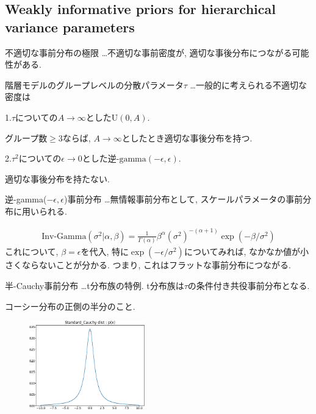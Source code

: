 \documentclass[11pt,a4pape,dvipdfmx]{jarticle}
\newcommand{\eqn}[1]{\begin{align*}#1\end{align*}}
\begin{document}

\subsection{Weakly informative priors for hierarchical variance parameters}
\begin{itembox}[l]{不適切な事前分布の極限}
…不適切な事前密度が, 適切な事後分布につながる可能性がある.
\end{itembox}


\begin{itembox}[l]{階層モデルのグループレベルの分散パラメータ$\tau$}
…一般的に考えられる不適切な密度は

1.$\tau$についての$A\rightarrow \infty$とした$\text{U}(0, A)$.

グループ数$\geq 3$ならば, $A\rightarrow\infty$としたとき適切な事後分布を持つ.

2.$\tau^2$についての$\epsilon\rightarrow 0$とした逆-$\text{gamma}(-\epsilon, \epsilon)$.

適切な事後分布を持たない.
\end{itembox}

\begin{itembox}[l]{逆-gamma($-\epsilon,\epsilon$)事前分布}
…無情報事前分布として, スケールパラメータの事前分布に用いられる.
\end{itembox}

\eqn{\text{Inv-Gamma}(\sigma^2|\alpha,\beta)=\frac{1}{\Gamma(\alpha)} \beta^{\alpha} (\sigma^2)^{-(\alpha+1)} \exp\left(-\beta/\sigma^2 \right)}
これについて, $\beta=\epsilon$を代入, 特に$\exp(-\epsilon/\sigma^2)$についてみれば, なかなか値が小さくならないことが分かる.
つまり, これはフラットな事前分布につながる.


\begin{itembox}[l]{半-Cauchy事前分布}
…t分布族の特例.
t分布族は$\tau$の条件付き共役事前分布となる.
\end{itembox}
コーシー分布の正側の半分のこと.

\begin{figure}[H]
\begin{center}
\includegraphics[clip, width=5cm]{../5/code/cauchy.png}
\end{center}
\end{figure}
\end{document}
